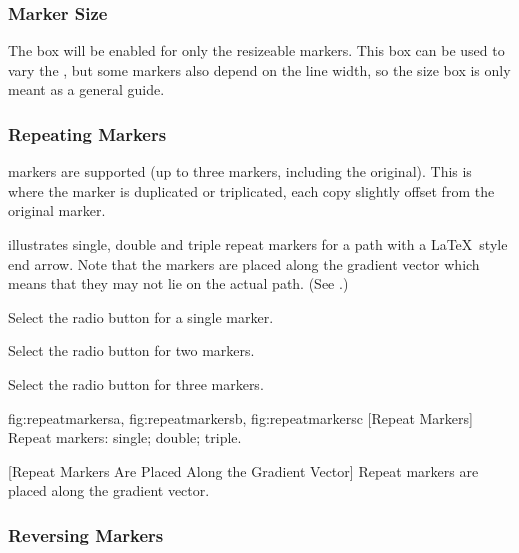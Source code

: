 \subsubsection{Marker Size}\label{sec:markersize}



The  box will be enabled for only the
resizeable markers. This box can be used to vary the 
,
but some markers also depend on the line width, so the size box is
only meant as a general guide.

\subsubsection{Repeating Markers}\label{sec:repeatingmarkers}

 markers are supported (up to
three markers, including the original). This is where the marker is
duplicated or triplicated, each copy slightly offset from the original marker.

 illustrates single, double and triple
repeat markers for a path with a \LaTeX\ style end arrow. Note that
the markers are placed along the gradient vector which means that
they may not lie on the actual path. (See
.)


Select the  radio button for a single marker.


Select the  radio button for two markers.


Select the  radio button for three markers.

{
  {fig:repeatmarkersa}{}{},
  {fig:repeatmarkersb}{}{},
  {fig:repeatmarkersc}{}{}
}
[Repeat Markers]
{Repeat markers:
 single;
 double;
 triple.}

{}
[Repeat Markers Are Placed Along the Gradient Vector]
{Repeat markers are placed along the gradient vector.}


\subsubsection{Reversing Markers}\label{sec:reversingmarkers}

